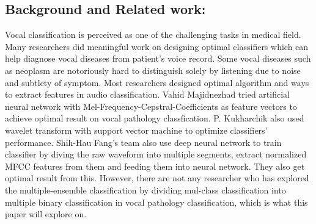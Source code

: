 \subsection{Background and Related work:}
	Vocal classification is perceived as one of the challenging tasks in medical field. Many researchers did meaningful work on designing optimal classifiers which can help diagnose vocal diseases from patient's voice record. Some vocal diseases such as neoplasm are notoriously hard to distinguish solely by listening due to noise and subtlety of symptom. 
	Most researchers designed optimal algorithm and ways to extract features in audio classification.
	Vahid Majidnezhad tried artificial neural network with Mel-Frequency-Cepstral-Coefficients as feature vectors to achieve optimal result on vocal pathology classfication\cite{b5}. P. Kukharchik also used wavelet transform with support vector machine to optimize classifiers' performance\cite{b4}. Shih-Hau Fang's team also use deep neural network to train classifier by diving the raw waveform into multiple segments, extract normalized MFCC features from them and feeding them into neural network. They also get optimal result from this\cite{b9}.
	However, there are not any researcher who has explored the multiple-ensemble classification by dividing mul-class classification into multiple binary classification in vocal pathology classification, which is what this paper will explore on. 

	